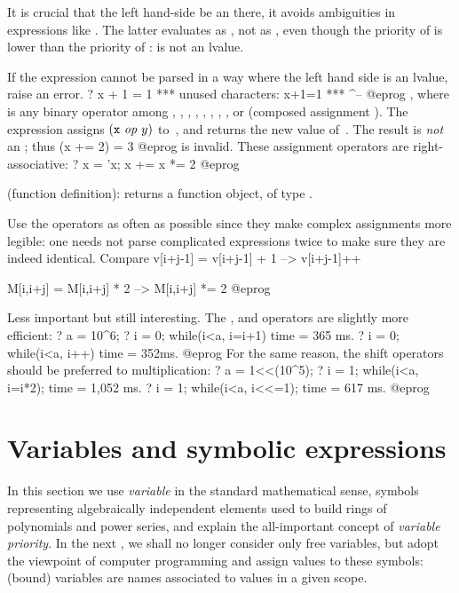 It is crucial that the left hand-side be an  there, it avoids
ambiguities in expressions like . The latter evaluates as
, not as , even though the priority of
\kbd{=} is lower than the priority of \kbd{+} :  is not an lvalue.

If the expression cannot be parsed in a way where the left hand side is an
lvalue, raise an error.
\bprog
? x + 1 = 1
  ***   unused characters: x+1=1
  ***                         ^--
@eprog
\leavevmode
{}, where  is any binary operator
among \kbd{+}, \kbd{-}, \kbd{*}, \kbd{\%}, \kbd{/}, \kbd{\bs}, \kbd{\bs/},
\kbd{<<}, or
\kbd{>>} (composed assignment  \kbd{=} ).
The expression  assigns $({\tt x}~\hbox{\it op\/}~y)$
to~, and returns the new value of~. The result is \emph{not}
an ; thus
\bprog
  (x += 2) = 3
@eprog\noindent
is invalid. These assignment operators are right-associative:
\bprog
  ? x = 'x; x += x *= 2
@eprog

\kbd{->} (function definition):  returns a
function object, of type .

 Use the \kbd{=} operators as often as possible
since they make complex assignments more legible: one needs not parse
complicated expressions twice to make sure they are indeed identical. Compare
\bprog
v[i+j-1] = v[i+j-1] + 1    -->    v[i+j-1]++

M[i,i+j] = M[i,i+j] * 2    -->    M[i,i+j] *= 2
@eprog

 Less important but still interesting. The
\kbd{++}, \kbd{--} and \kbd{=} operators are slightly more efficient:
\bprog
? a = 10^6;
? i = 0; while(i<a, i=i+1)
time = 365 ms.
? i = 0; while(i<a, i++)
time = 352ms.
@eprog
\noindent For the same reason, the shift operators should be preferred to
multiplication:
\bprog
? a = 1<<(10^5);
? i = 1; while(i<a, i=i*2);
time = 1,052 ms.
? i = 1; while(i<a, i<<=1);
time = 617 ms.
@eprog

\section{Variables and symbolic expressions}\label{se:varsymb}
In this section we use \emph{variable} in the standard mathematical
sense, symbols representing algebraically independent elements used to build
rings of polynomials and power series, and explain the all-important concept
of \emph{variable priority}. In the next , we shall no
longer consider only free variables, but adopt the viewpoint of computer
programming and assign values to these symbols: (bound) variables are names
associated to values in a given scope.

